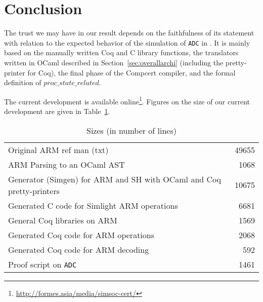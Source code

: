 \section{Conclusion}
\label{sec:conclusion}

The trust we may have in our result depends on
the faithfulness of its statement with relation to 
the expected behavior of the simulation of \texttt{ADC} in \simlight.
It is mainly based on 
the manually written Coq and C library functions, 
the translators written in OCaml described in 
Section~\ref{sec:overallarchi}
(including the pretty-printer for Coq),
the final phase of the Compcert compiler,
and the formal definition of $\mathit{proc\_state\_related}$.



The current development is available online\footnote{%
\label{f:site}
\url{http://formes.asia/media/simsoc-cert/}}.
Figures on the size of our current development are given in
Table~\ref{tab:sizes}.

\begin{table}[t]
  \centering
  \begin{tabular}{|l|r@{~}|}
    \hline 
    Original ARM ref man (txt)                                             & 49655 \\ %
    ARM Parsing to an OCaml AST                                            & 1068 \\ %
    Generator (Simgen) for ARM and SH with OCaml and Coq pretty-printers   & 10675 \\ %
    Generated C code for Simlight ARM operations                           & 6681 \\ %
    General Coq libraries on ARM                                           & 1569 \\ %
    Generated Coq code for ARM operations                                  & 2068 \\
    Generated Coq code for ARM decoding                                    & 592 \\
    Proof script on \texttt{ADC}                                           & 1461 \\ %
    \hline 
  \end{tabular}
  \smallskip
  \caption{Sizes (in number of lines)}
  \label{tab:sizes}
\end{table}

